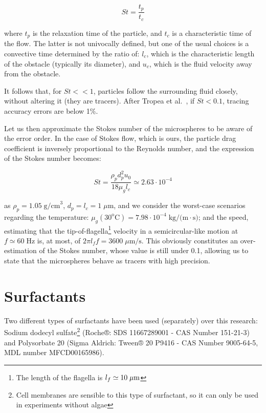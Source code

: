 \begin{equation}
St = \frac{t_p}{t_c}
\end{equation}

where $t_p$ is the relaxation time of the particle, and $t_c$ is a characteristic time of the flow. The latter is not univocally defined, but one of the usual choices is a convective time determined by the ratio of: $l_c$, which is the characteristic length of the obstacle (typically its diameter), and $u_c$, which is the fluid velocity away from the obstacle.

It follows that, for $St << 1$, particles follow the surrounding fluid closely, without altering it (they are tracers). After Tropea et al.~\cite{Tropea}, if  $St < 0.1$, tracing accuracy errors are below 1\%.

Let us then approximate the Stokes number of the microspheres to be aware of the error order. In the case of Stokes flow, which is ours, the particle drag coefficient is inversely proportional to the Reynolds number, and the expression of the Stokes number becomes:

\begin{equation}
	St = \frac{\rho_p d_p^2 u_0}{18 \mu_g l_c} \simeq 2.63 \cdot 10^{-4}
\end{equation}

as $\rho_p = 1.05 \; \textrm{g/cm}^\textrm{3}$, $d_p = l_c = 1 \; \mu \textrm{m}$, and we consider the worst-case scenarios regarding the temperature: $\mu_g(30^\textrm{o} \textrm{C}) = 7.98 \cdot 10^{-4} \; \textrm{kg/(m} \cdot \textrm{s)}$; and the speed, estimating that the tip-of-flagella\footnote{The length of the flagella is $l_f \simeq 10 \; \mu \textrm m $} velocity in a semicircular-like motion at $ f \simeq 60 \; \textrm{Hz}$ is, at most, of $ 2 \pi l_f f = 3600 \; \mu \textrm{m/s}$. This obviously constitutes an over-estimation of the Stokes number, whose value is still under 0.1, allowing us to state that the microspheres behave as tracers with high precision.

\section{Surfactants}
\label{mm_surfactants}

Two different types of surfactants have been used (separately) over this research: Sodium dodecyl sulfate\footnote{Cell membranes are sensible to this type of surfactant, so it can only be used in experiments without algae} (Roche®: SDS 11667289001 - CAS Number 151-21-3) and Polysorbate 20 (Sigma Aldrich: Tween® 20 P9416 - CAS Number 9005-64-5, MDL number MFCD00165986).
 

